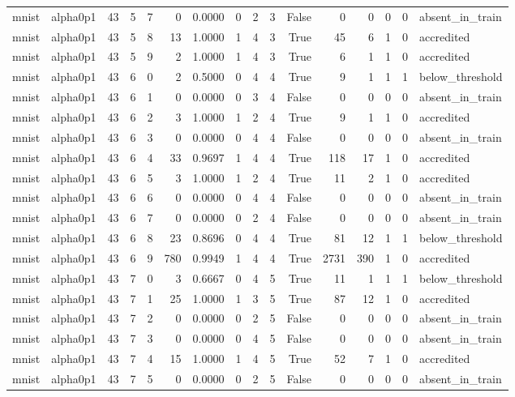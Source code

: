 \begin{tabular}{llrrrrrrrrrrrrrl}
mnist & alpha0p1 & 43 & 5 & 7 & 0 & 0.0000 & 0 & 2 & 3 & False & 0 & 0 & 0 & 0 & absent\_in\_train \\
mnist & alpha0p1 & 43 & 5 & 8 & 13 & 1.0000 & 1 & 4 & 3 & True & 45 & 6 & 1 & 0 & accredited \\
mnist & alpha0p1 & 43 & 5 & 9 & 2 & 1.0000 & 1 & 4 & 3 & True & 6 & 1 & 1 & 0 & accredited \\
mnist & alpha0p1 & 43 & 6 & 0 & 2 & 0.5000 & 0 & 4 & 4 & True & 9 & 1 & 1 & 1 & below\_threshold \\
mnist & alpha0p1 & 43 & 6 & 1 & 0 & 0.0000 & 0 & 3 & 4 & False & 0 & 0 & 0 & 0 & absent\_in\_train \\
mnist & alpha0p1 & 43 & 6 & 2 & 3 & 1.0000 & 1 & 2 & 4 & True & 9 & 1 & 1 & 0 & accredited \\
mnist & alpha0p1 & 43 & 6 & 3 & 0 & 0.0000 & 0 & 4 & 4 & False & 0 & 0 & 0 & 0 & absent\_in\_train \\
mnist & alpha0p1 & 43 & 6 & 4 & 33 & 0.9697 & 1 & 4 & 4 & True & 118 & 17 & 1 & 0 & accredited \\
mnist & alpha0p1 & 43 & 6 & 5 & 3 & 1.0000 & 1 & 2 & 4 & True & 11 & 2 & 1 & 0 & accredited \\
mnist & alpha0p1 & 43 & 6 & 6 & 0 & 0.0000 & 0 & 4 & 4 & False & 0 & 0 & 0 & 0 & absent\_in\_train \\
mnist & alpha0p1 & 43 & 6 & 7 & 0 & 0.0000 & 0 & 2 & 4 & False & 0 & 0 & 0 & 0 & absent\_in\_train \\
mnist & alpha0p1 & 43 & 6 & 8 & 23 & 0.8696 & 0 & 4 & 4 & True & 81 & 12 & 1 & 1 & below\_threshold \\
mnist & alpha0p1 & 43 & 6 & 9 & 780 & 0.9949 & 1 & 4 & 4 & True & 2731 & 390 & 1 & 0 & accredited \\
mnist & alpha0p1 & 43 & 7 & 0 & 3 & 0.6667 & 0 & 4 & 5 & True & 11 & 1 & 1 & 1 & below\_threshold \\
mnist & alpha0p1 & 43 & 7 & 1 & 25 & 1.0000 & 1 & 3 & 5 & True & 87 & 12 & 1 & 0 & accredited \\
mnist & alpha0p1 & 43 & 7 & 2 & 0 & 0.0000 & 0 & 2 & 5 & False & 0 & 0 & 0 & 0 & absent\_in\_train \\
mnist & alpha0p1 & 43 & 7 & 3 & 0 & 0.0000 & 0 & 4 & 5 & False & 0 & 0 & 0 & 0 & absent\_in\_train \\
mnist & alpha0p1 & 43 & 7 & 4 & 15 & 1.0000 & 1 & 4 & 5 & True & 52 & 7 & 1 & 0 & accredited \\
mnist & alpha0p1 & 43 & 7 & 5 & 0 & 0.0000 & 0 & 2 & 5 & False & 0 & 0 & 0 & 0 & absent\_in\_train \\

\end{tabular}
